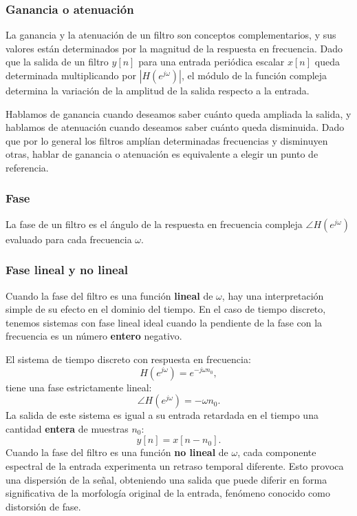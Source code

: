\documentclass[11pt,a4paper,openany]{book}
\begin{document}
\subsubsection{Ganancia o atenuaci\'{o}n}

La ganancia y la atenuaci\'{o}n de un filtro son conceptos complementarios, y sus valores est\'{a}n determinados por la magnitud de la respuesta en frecuencia. Dado que la salida de un filtro $y[n]$ para una entrada peri\'{o}dica escalar $x[n]$ queda determinada multiplicando por $|H(e^{j\omega})|$, el m\'{o}dulo de la funci\'{o}n compleja determina la variaci\'{o}n de la amplitud de la salida respecto a la entrada. 

Hablamos de ganancia cuando deseamos saber cu\'{a}nto queda ampliada la salida, y hablamos de atenuaci\'{o}n cuando deseamos saber cu\'{a}nto queda disminuida. Dado que por lo general los filtros ampl\'{i}an determinadas frecuencias y disminuyen otras, hablar de ganancia o atenuaci\'{o}n es equivalente a elegir un punto de referencia.

\subsubsection{Fase}

La fase de un filtro es el ángulo de la respuesta en frecuencia compleja $\angle H(e^{j\omega})$ evaluado para cada frecuencia $\omega$.

\subsubsection{Fase lineal y no lineal}

Cuando la fase del filtro es una funci\'{o}n \textbf{lineal} de $\omega$, hay una interpretaci\'{o}n simple de su efecto en el dominio del tiempo. En el caso de tiempo discreto, tenemos sistemas con fase lineal ideal cuando la pendiente de la fase con la frecuencia es un n\'{u}mero \textbf{entero} negativo. 

El sistema de tiempo discreto con respuesta en frecuencia:
\begin{equation}
	H(e^{j\omega}) = e^{-j\omega n_{0}},
\end{equation}
tiene una fase estrictamente lineal:
\begin{equation}
	\angle H(e^{j\omega}) = -\omega n_{0}.
\end{equation}
La salida de este sistema es igual a su entrada retardada en el tiempo una cantidad \textbf{entera} de muestras $n_{0}$:
\begin{equation}
	y[n] = x[n - n_{0}].
\end{equation}
Cuando la fase del filtro es una funci\'{o}n \textbf{no lineal} de $\omega$, cada componente espectral de la entrada experimenta un retraso temporal diferente. Esto provoca una dispersión de la señal, obteniendo una salida que puede diferir en forma significativa de la morfología original de la entrada, fenómeno conocido como distorsión de fase.
\end{document}
